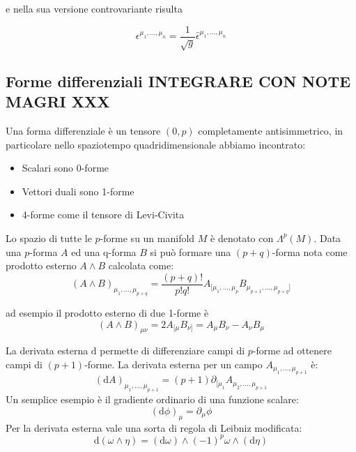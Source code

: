 \documentclass[twoside]{article}
\begin{document}
e nella sua versione controvariante risulta 

\begin{equation}
	\epsilon^{\mu_1,\ldots,\mu_n} = \frac{1}{\sqrt{g}}\hat{\epsilon}^{\mu_1,\ldots,\mu_n}
\end{equation}


\subsection{Forme differenziali INTEGRARE CON NOTE MAGRI XXX}
Una forma differenziale è un tensore $(0,p)$ completamente antisimmetrico, in particolare nello spaziotempo quadridimensionale abbiamo incontrato:
\begin{itemize}
	\item Scalari sono 0-forme
	\item Vettori duali sono 1-forme
	\item 4-forme come il tensore di Levi-Civita
\end{itemize}

Lo spazio di tutte le $p$-forme su un manifold $M$ è denotato con $\Lambda^p(M)$. Data una $p$-forma $A$ ed una q-forma $B$ si può formare una $(p+q)$-forma nota come prodotto esterno $A\wedge B$ calcolata come:
\begin{equation*}
	(A\wedge B)_{\mu_1,\ldots,\mu_{p+q}} = \dfrac{(p+q)!}{p!q!}A_{[\mu_1,\ldots,\mu_p}B_{\mu_{p+1},\ldots,\mu_{p+q}]}
\end{equation*}

ad esempio il prodotto esterno di due 1-forme è
$$
(A\wedge B)_{\mu \nu} = 2A_{[\mu}B_{\nu]} = A_{\mu}B_{\nu}-A_{\nu}B_{\mu}
$$

La derivata esterna $\textrm{d}$ permette di differenziare campi di $p$-forme ad ottenere campi di $(p+1)$-forme.
La derivata esterna per un campo $A_{\mu_1,\ldots,\mu_{p+1}}$ è:
\begin{equation}\label{eq:exteriorderivative}
	(\textrm{d}A)_{\mu_1,\ldots,\mu_{p+1}} = (p+1)\partial_{[\mu_1}A_{\mu_2,\ldots,\mu_{p+1}}
\end{equation}
Un semplice esempio è il gradiente ordinario di una funzione scalare:
\begin{equation}
	(\textrm{d}\phi)_{\mu} = \partial_\mu \phi
\end{equation}
Per la derivata esterna vale una sorta di regola di Leibniz modificata:
\begin{equation}
	\textrm{d}(\omega \wedge \eta) = (\textrm{d}\omega) \wedge (-1)^p \omega \wedge (\textrm{d}\eta)
\end{equation}
\end{document}
